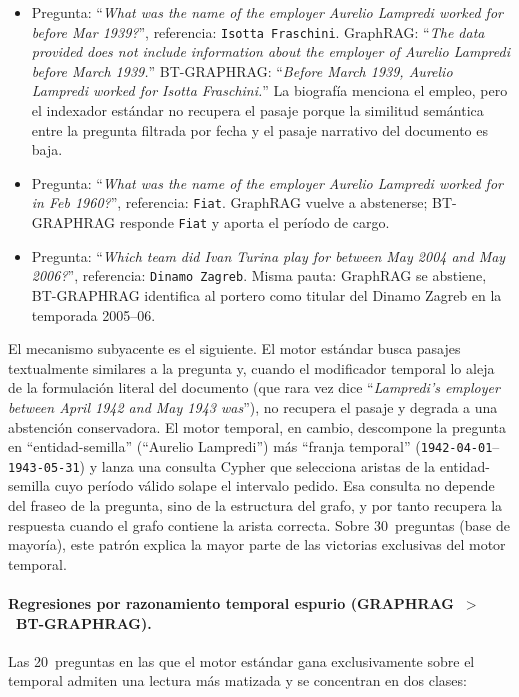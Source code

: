 \begin{itemize}
\item Pregunta: ``\emph{What was the name of the employer Aurelio Lampredi worked for before Mar 1939?}'', referencia: \texttt{Isotta Fraschini}. GraphRAG: ``\emph{The data provided does not include information about the employer of Aurelio Lampredi before March 1939.}'' BT-GRAPHRAG: ``\emph{Before March 1939, Aurelio Lampredi worked for Isotta Fraschini.}'' La biografía menciona el empleo, pero el indexador estándar no recupera el pasaje porque la similitud semántica entre la pregunta filtrada por fecha y el pasaje narrativo del documento es baja.
\item Pregunta: ``\emph{What was the name of the employer Aurelio Lampredi worked for in Feb 1960?}'', referencia: \texttt{Fiat}. GraphRAG vuelve a abstenerse; BT-GRAPHRAG responde \texttt{Fiat} y aporta el período de cargo.
\item Pregunta: ``\emph{Which team did Ivan Turina play for between May 2004 and May 2006?}'', referencia: \texttt{Dinamo Zagreb}. Misma pauta: GraphRAG se abstiene, BT-GRAPHRAG identifica al portero como titular del Dinamo Zagreb en la temporada 2005--06.
\end{itemize}

El mecanismo subyacente es el siguiente. El motor estándar busca pasajes textualmente similares a la pregunta y, cuando el modificador temporal lo aleja de la formulación literal del documento (que rara vez dice ``\emph{Lampredi's employer between April 1942 and May 1943 was}''), no recupera el pasaje y degrada a una abstención conservadora. El motor temporal, en cambio, descompone la pregunta en ``entidad-semilla'' (``Aurelio Lampredi'') más ``franja temporal'' (\texttt{1942-04-01}--\texttt{1943-05-31}) y lanza una consulta Cypher que selecciona aristas de la entidad-semilla cuyo período válido solape el intervalo pedido. Esa consulta no depende del fraseo de la pregunta, sino de la estructura del grafo, y por tanto recupera la respuesta cuando el grafo contiene la arista correcta. Sobre 30~preguntas (base de mayoría), este patrón explica la mayor parte de las victorias exclusivas del motor temporal.

\paragraph{Regresiones por razonamiento temporal espurio (GRAPHRAG~$>$~BT-GRAPHRAG).} Las 20~preguntas en las que el motor estándar gana exclusivamente sobre el temporal admiten una lectura más matizada y se concentran en dos clases:

